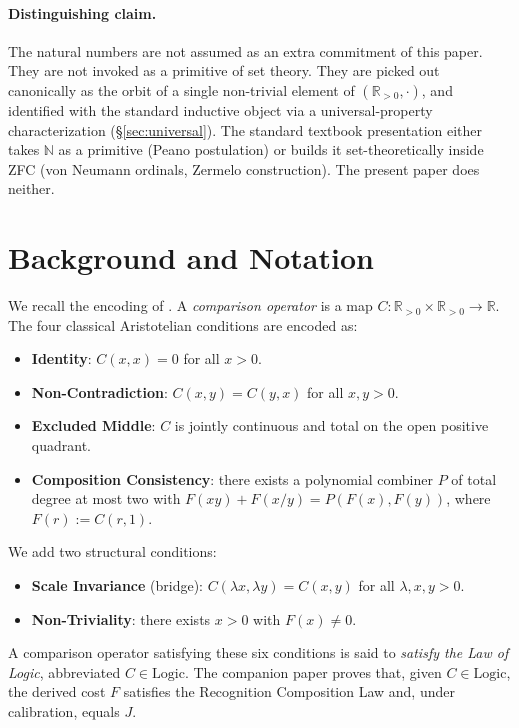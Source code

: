 \documentclass[11pt,a4paper]{article}
\theoremstyle{definition}
\theoremstyle{remark}
\begin{document}
\paragraph{Distinguishing claim.} The natural numbers are not assumed
as an extra commitment of this paper. They are not invoked as a
primitive of set theory. They are picked out canonically as the orbit
of a single non-trivial element of $(\mathbb{R}_{>0}, \cdot)$, and
identified with the standard inductive object via a universal-property
characterization (\S\ref{sec:universal}). The standard textbook
presentation either takes $\mathbb{N}$ as a primitive (Peano
postulation) or builds it set-theoretically inside ZFC (von Neumann
ordinals, Zermelo construction). The present paper does neither.

\section{Background and Notation}
\label{sec:background}

We recall the encoding of \cite{Washburn2026LogicFE}. A
\emph{comparison operator} is a map $C : \mathbb{R}_{>0} \times
\mathbb{R}_{>0} \to \mathbb{R}$. The four classical Aristotelian
conditions are encoded as:

\begin{itemize}
\item \textbf{Identity}: $C(x, x) = 0$ for all $x > 0$.
\item \textbf{Non-Contradiction}: $C(x, y) = C(y, x)$ for all $x, y > 0$.
\item \textbf{Excluded Middle}: $C$ is jointly continuous and total on
the open positive quadrant.
\item \textbf{Composition Consistency}: there exists a polynomial
combiner $P$ of total degree at most two with
$F(xy) + F(x/y) = P(F(x), F(y))$, where $F(r) := C(r, 1)$.
\end{itemize}

We add two structural conditions:

\begin{itemize}
\item \textbf{Scale Invariance} (bridge): $C(\lambda x, \lambda y) = C(x, y)$
for all $\lambda, x, y > 0$.
\item \textbf{Non-Triviality}: there exists $x > 0$ with $F(x) \neq 0$.
\end{itemize}

A comparison operator satisfying these six conditions is said to
\emph{satisfy the Law of Logic}, abbreviated $C \in \mathrm{Logic}$.
The companion paper proves that, given $C \in \mathrm{Logic}$, the
derived cost $F$ satisfies the Recognition Composition Law and, under
calibration, equals $J$.
\end{document}
